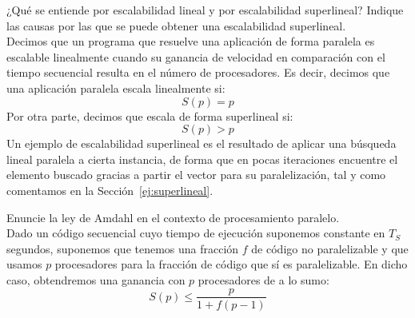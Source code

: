 \begin{cuestion}
    ¿Qué se entiende por escalabilidad lineal y por escalabilidad superlineal? Indique las causas por las que se puede obtener una escalabilidad superlineal.\\

    Decimos que un programa que resuelve una aplicación de forma paralela es escalable linealmente cuando su ganancia de velocidad en comparación con el tiempo secuencial resulta en el número de procesadores. Es decir, decimos que una aplicación paralela escala linealmente si:
    \begin{equation*}
        S(p) = p
    \end{equation*}
    Por otra parte, decimos que escala de forma superlineal si:
    \begin{equation*}
        S(p) > p
    \end{equation*}
    Un ejemplo de escalabilidad superlineal es el resultado de aplicar una búsqueda lineal paralela a cierta instancia, de forma que en pocas iteraciones encuentre el elemento buscado gracias a partir el vector para su paralelización, tal y como comentamos en la Sección~\ref{ej:superlineal}.
\end{cuestion}

\begin{cuestion}
    Enuncie la ley de Amdahl en el contexto de procesamiento paralelo.\\

    Dado un código secuencial cuyo tiempo de ejecución suponemos constante en $T_S$ segundos, suponemos que tenemos una fracción $f$ de código no paralelizable y que usamos $p$ procesadores para la fracción de código que sí es paralelizable. En dicho caso, obtendremos una ganancia con $p$ procesadores de a lo sumo:
    \begin{equation*}
        S(p) \leq \dfrac{p}{1+f(p-1)}
    \end{equation*}
\end{cuestion}

